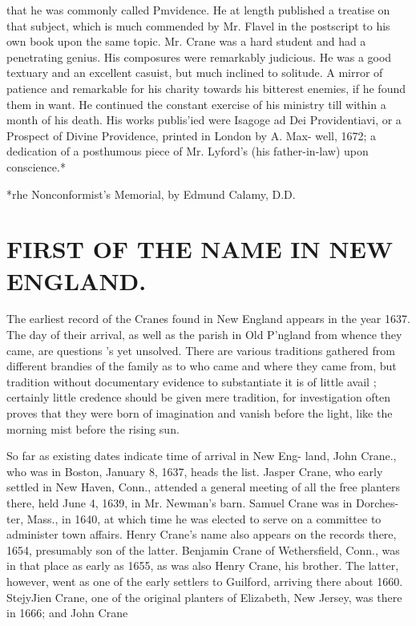 \documentclass{book}
\begin{document}
that he was commonly called Pmvidence. He at length published 
a treatise on that subject, which is much commended by Mr. 
Flavel in the postscript to his own book upon the same topic. 
Mr. Crane was a hard student and had a penetrating genius. 
His composures were remarkably judicious. He was a good 
textuary and an excellent casuist, but much inclined to solitude. 
A mirror of patience and remarkable for his charity towards his 
bitterest enemies, if he found them in want. He continued the 
constant exercise of his ministry till within a month of his death. 
His works publis'ied were Isagoge ad Dei Providentiavi, or a 
Prospect of Divine Providence, printed in London by A. Max- 
well, 1672; a dedication of a posthumous piece of Mr. Lyford's 
(his father-in-law) upon conscience.* 

*rhe Nonconformist's Memorial, by Edmund Calamy, D.D. 



\chapter{FIRST OF THE NAME IN NEW ENGLAND.}


The earliest record of the Cranes found in New England appears 
in the year 1637. The day of their arrival, as well as the parish 
in Old P'ngland from whence they came, are questions 's yet 
unsolved. There are various traditions gathered from different 
brandies of the family as to who came and where they came 
from, but tradition without documentary evidence to substantiate 
it is of little avail ; certainly little credence should be given mere 
tradition, for investigation often proves that they were born of 
imagination and vanish before the light, like the morning mist 
before the rising sun. 

So far as existing dates indicate time of arrival in New Eng- 
land, John Crane., who was in Boston, January 8, 1637, heads the 
list. Jasper Crane, who early settled in New Haven, Conn., 
attended a general meeting of all the free planters there, held June 
4, 1639, in Mr. Newman's barn. Samuel Crane was in Dorches- 
ter, Mass., in 1640, at which time he was elected to serve on a 
committee to administer town affairs. Henry Crane's name also 
appears on the records there, 1654, presumably son of the latter. 
Benjamin Crane of Wethersfield, Conn., was in that place as 
early as 1655, as was also Henry Crane, his brother. The latter, 
however, went as one of the early settlers to Guilford, arriving 
there about 1660. StejyJien Crane, one of the original planters 
of Elizabeth, New Jersey, was there in 1666; and John Crane 
\end{document}
